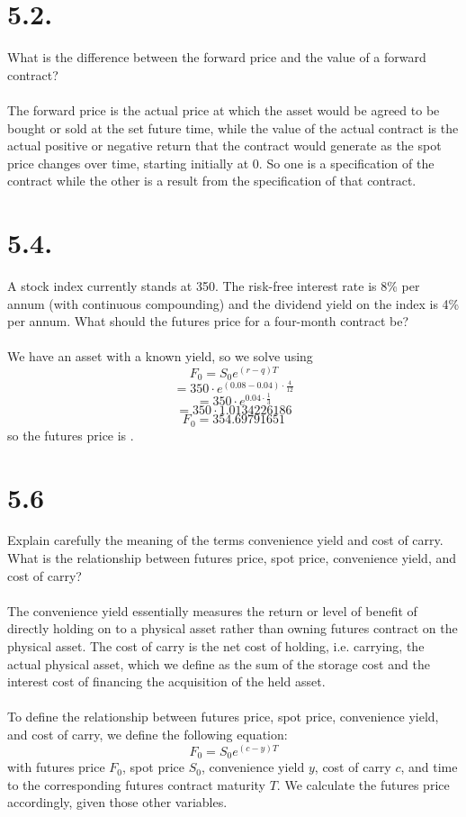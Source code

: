 \documentclass{article}
\begin{document}
\thispagestyle{firstpageheader}
{\Large 

\section*{5.2.}
What is the difference between the forward price and the value of a forward contract? \\ \\
The forward price is the actual price at which the asset would be agreed to be bought or sold at the set future time, while the value of the actual contract is the actual positive or negative return that the contract would generate as the spot price changes over time, starting initially at 0. So one is a specification of the contract while the other is a result from the specification of that contract. 

}
{\Large 

\section*{5.4.}
A stock index currently stands at 350. The risk-free interest rate is 8\% per annum (with continuous compounding) and the dividend yield on the index is 4\% per annum. What should the futures price for a four-month contract be? \\ \\
We have an asset with a known yield, so we solve using 
\[
  F_0 = S_0 e^{(r-q)T}
\]
\[
  = 350 \cdot e^{(0.08 - 0.04) \cdot \frac{4}{12}}
\]
\[
  = 350 \cdot e^{0.04 \cdot \frac{1}{3}}
\]
\[
  = 350 \cdot 1.0134226186
\]
\[
  F_0 = 354.69791651
\]
so the futures price is .

}
{\Large 

\section*{5.6}
Explain carefully the meaning of the terms convenience yield and cost of carry. What is the relationship between futures price, spot price, convenience yield, and cost of carry? \\ \\
The convenience yield essentially measures the return or level of benefit of directly holding on to a physical asset rather than owning futures contract on the physical asset. The cost of carry is the net cost of holding, i.e. carrying, the actual physical asset, which we define as the sum of the storage cost and the interest cost of financing the acquisition of the held asset. \\ \\
To define the relationship between futures price, spot price, convenience yield, and cost of carry, we define the following equation: 
\[
  F_0 = S_0 e^{(c-y)T}
\]
with futures price \(F_0\), spot price \(S_0\), convenience yield \(y\), cost of carry \(c\), and time to the corresponding futures contract maturity \(T\). We calculate the futures price accordingly, given those other variables.

}
\end{document}
